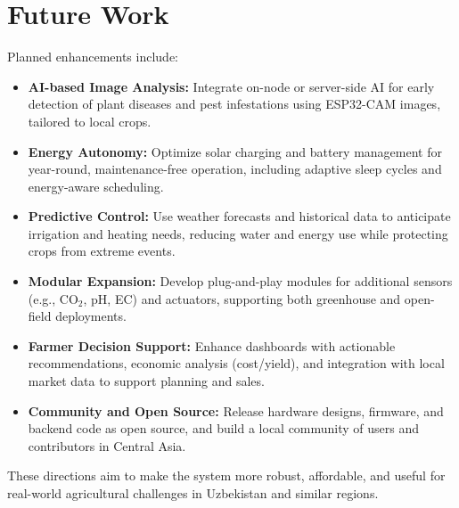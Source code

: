 \documentclass[12pt,a4paper]{article}
\begin{document}
\section{Future Work}
Planned enhancements include:
\begin{itemize}
    \item \textbf{AI-based Image Analysis:} Integrate on-node or server-side AI for early detection of plant diseases and pest infestations using ESP32-CAM images, tailored to local crops.
    \item \textbf{Energy Autonomy:} Optimize solar charging and battery management for year-round, maintenance-free operation, including adaptive sleep cycles and energy-aware scheduling.
    \item \textbf{Predictive Control:} Use weather forecasts and historical data to anticipate irrigation and heating needs, reducing water and energy use while protecting crops from extreme events.
    \item \textbf{Modular Expansion:} Develop plug-and-play modules for additional sensors (e.g., CO$_2$, pH, EC) and actuators, supporting both greenhouse and open-field deployments.
    \item \textbf{Farmer Decision Support:} Enhance dashboards with actionable recommendations, economic analysis (cost/yield), and integration with local market data to support planning and sales.
    \item \textbf{Community and Open Source:} Release hardware designs, firmware, and backend code as open source, and build a local community of users and contributors in Central Asia.
\end{itemize}
These directions aim to make the system more robust, affordable, and useful for real-world agricultural challenges in Uzbekistan and similar regions.

\newpage
\end{document}
